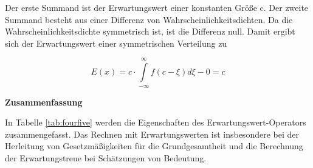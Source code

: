 \noindent Der erste Summand ist der Erwartungswert einer konstanten Gr\"{o}{\ss}e c. Der zweite Summand besteht aus einer Differenz von Wahrscheinlichkeitsdichten. Da die Wahrscheinlichkeitsdichte symmetrisch ist, ist die Differenz null. Damit ergibt sich der Erwartungswert einer symmetrischen Verteilung zu

\begin{equation}\label{eq:fourthirtyfour}
E(x)=c\cdot \int\limits _{-\infty }^{\infty }f\left(c-\xi \right) d\xi  -0=c
\end{equation}

\clearpage

{\selectfont
\noindent\textbf{Zusammenfassung}}\smallskip

\noindent In Tabelle \ref{tab:fourfive} werden die Eigenschaften des Erwartungswert-Operators zusammengefasst. Das Rechnen mit Erwartungswerten ist insbesondere bei der Herleitung von Gesetzm\"{a}{\ss}igkeiten f\"{u}r die Grundgesamtheit und die Berechnung der Erwartungstreue bei Sch\"{a}tzungen von Bedeutung.

